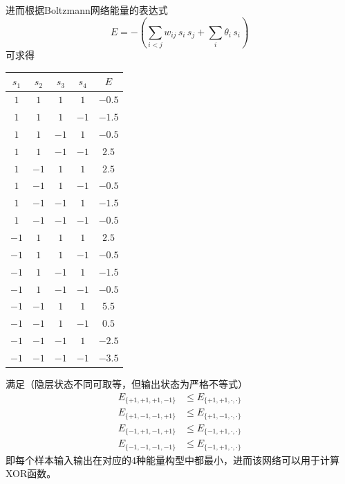 \documentclass[reportComp]{thesis}
\begin{document}
\begin{answer}
进而根据Boltzmann网络能量的表达式
\[E=-\left(\sum _{{i<j}}w_{{ij}}\,s_{i}\,s_{j}+\sum _{i}\theta _{i}\,s_{i}\right)\]
可求得
\begin{center}
\begin{longtable}{cccc|c}\hline
$s_1$ & $s_2$ & $s_3$ & $s_4$ & $E$\\\hline
$1$ & $1$ & $1$ & $1$ & $-0.5$ \\
$1$ & $1$ & $1$ & $-1$ & $-1.5$ \\
$1$ & $1$ & $-1$ & $1$ & $-0.5$ \\
$1$ & $1$ & $-1$ & $-1$ & $2.5$ \\
$1$ & $-1$ & $1$ & $1$ & $2.5$ \\
$1$ & $-1$ & $1$ & $-1$ & $-0.5$ \\
$1$ & $-1$ & $-1$ & $1$ & $-1.5$ \\
$1$ & $-1$ & $-1$ & $-1$ & $-0.5$ \\
$-1$ & $1$ & $1$ & $1$ & $2.5$ \\
$-1$ & $1$ & $1$ & $-1$ & $-0.5$ \\
$-1$ & $1$ & $-1$ & $1$ & $-1.5$ \\
$-1$ & $1$ & $-1$ & $-1$ & $-0.5$ \\
$-1$ & $-1$ & $1$ & $1$ & $5.5$ \\
$-1$ & $-1$ & $1$ & $-1$ & $0.5$ \\
$-1$ & $-1$ & $-1$ & $1$ & $-2.5$ \\
$-1$ & $-1$ & $-1$ & $-1$ & $-3.5$ \\\hline
\end{longtable}
\end{center}
满足（隐层状态不同可取等，但输出状态为严格不等式）
\[\begin{aligned}
E_{\{+1,+1,+1,-1\}} &\leq E_{\{+1,+1,\cdot,\cdot\}}\\
E_{\{+1,-1,-1,+1\}} &\leq E_{\{+1,-1,\cdot,\cdot\}}\\
E_{\{-1,+1,-1,+1\}} &\leq E_{\{-1,+1,\cdot,\cdot\}}\\
E_{\{-1,-1,-1,-1\}} &\leq E_{\{-1,+1,\cdot,\cdot\}}
\end{aligned}\]
即每个样本输入输出在对应的4种能量构型中都最小，进而该网络可以用于计算XOR函数。
\end{answer}
\end{document}
